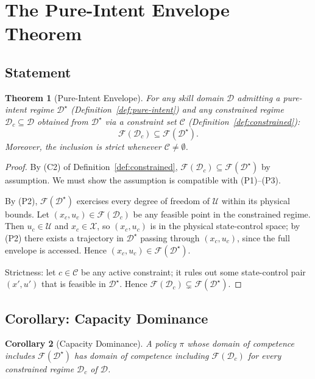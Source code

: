 \documentclass[11pt,twocolumn,a4paper]{article}
\newtheorem{theorem}{Theorem}[section]
\newtheorem{corollary}[theorem]{Corollary}
\newcommand{\cF}{\mathcal{F}}
\newcommand{\cD}{\mathcal{D}}
\newcommand{\cC}{\mathcal{C}}
\newcommand{\cX}{\mathcal{X}}
\newcommand{\cU}{\mathcal{U}}
\begin{document}
\section{The Pure-Intent Envelope Theorem}
\label{sec:envelope}

\subsection{Statement}

\begin{theorem}[Pure-Intent Envelope]
\label{thm:envelope}
For any skill domain $\cD$ admitting a pure-intent regime $\cD^\star$ (Definition~\ref{def:pure-intent}) and any constrained regime $\cD_c \subseteq \cD$ obtained from $\cD^\star$ via a constraint set $\cC$ (Definition~\ref{def:constrained}):
\begin{equation}
\cF(\cD_c) \subseteq \cF(\cD^\star).
\end{equation}
Moreover, the inclusion is strict whenever $\cC \neq \emptyset$.
\end{theorem}

\begin{proof}
By (C2) of Definition~\ref{def:constrained}, $\cF(\cD_c) \subseteq \cF(\cD^\star)$ by assumption. We must show the assumption is compatible with (P1)--(P3).

By (P2), $\cF(\cD^\star)$ exercises every degree of freedom of $\cU$ within its physical bounds. Let $(x_c, u_c) \in \cF(\cD_c)$ be any feasible point in the constrained regime. Then $u_c \in \cU$ and $x_c \in \cX$, so $(x_c, u_c)$ is in the physical state-control space; by (P2) there exists a trajectory in $\cD^\star$ passing through $(x_c, u_c)$, since the full envelope is accessed. Hence $(x_c, u_c) \in \cF(\cD^\star)$.

Strictness: let $c \in \cC$ be any active constraint; it rules out some state-control pair $(x', u')$ that is feasible in $\cD^\star$. Hence $\cF(\cD_c) \subsetneq \cF(\cD^\star)$.
\end{proof}

\subsection{Corollary: Capacity Dominance}

\begin{corollary}[Capacity Dominance]
\label{cor:capacity}
A policy $\pi$ whose domain of competence includes $\cF(\cD^\star)$ has domain of competence including $\cF(\cD_c)$ for every constrained regime $\cD_c$ of $\cD$.
\end{corollary}
\end{document}
